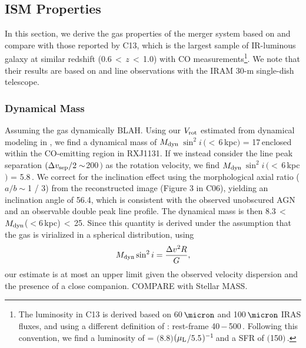 \documentclass[]{emulateapj}
\begin{document}
\subsection{ISM Properties} \label{sec:properties}
In this section, we derive the gas properties of the merger system
based on \bco and compare with those reported by
C13, which is the largest sample of
IR-luminous galaxy at similar redshift
(0.6\,$<$\,$z$\,$<$\,1.0) with CO measurements\footnote{The
\fir luminosity in C13 is derived based on 60\,$\micron$ and 100\,$\micron$ IRAS fluxes,
and using a different definition of
\LFIR: rest-frame 40\,$-$\,500\,\micron. Following this convention, 
we find a \fir luminosity of 
\LFIR = $($8.8$)$$(\mu_{\rm L}$/5.5$)\mbox{$^{-1}$}$\,\Lsun and
a SFR of $($150$)$\,\sfrU.}.
We note that their results are based on \bco and  line observations with the 
IRAM 30-m single-dish telescope.
 
 \subsubsection{Dynamical Mass}
 Assuming the \bco gas dynamically BLAH. 
Using our $V_{\rm rot}$ estimated from dynamical modeling in , 
we find a dynamical mass of
$M_{\rm dyn}$\,$\sin^2 i$\,$(<$\,6\,kpc$)$ = 17\,\Msun enclosed
within the CO-emitting region in RXJ1131. If we instead consider the
\bco line peak separation $(\Delta v_{\rm sep}/2 \sim$200\,\kms$)$ as the rotation velocity, we find
$M_{\rm dyn}$\,$\sin^2 i$\,$(<$\,6\,kpc$)$ = 5.8\,\Msun.
We correct for the inclination effect using the
morphological axial ratio ($a/b\sim$1 / 3) 
from the reconstructed image (Figure 3 in C06), yielding
an inclination angle of 56.4\degr, which is consistent with the
observed unobscured AGN and an observable double peak line profile.
The dynamical mass is then
8.3\Msun\,$<$\,$M_{\rm dyn}$($<$6\,kpc)\,$<$\,25\Msun.
Since this quantity is derived under the assumption that the gas is virialized in a  %
spherical distribution, \ie using 
\begin{equation}
M_{\rm dyn} \sin^2 i = \frac{\Delta v^2 R}{G},
\end{equation}
our estimate is at most an upper limit given the observed velocity dispersion and the
presence of a close companion.
COMPARE with Stellar MASS.
\end{document}
